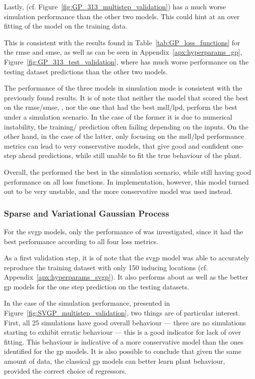 Lastly,  (cf. Figure~\ref{fig:GP_313_multistep_validation}) has a
much worse simulation performance than the other two models. This could hint at
an over fitting of the model on the training data.

\clearpage

This is consistent with the results found in Table~\ref{tab:GP_loss_functions}
for the \acrshort{rmse} and \acrshort{smse}, as well as can be seen in
Appendix~\ref{apx:hyperparams_gp}, Figure~\ref{fig:GP_313_test_validation},
where  has much worse performance on the testing dataset predictions
than the other two models.

The performance of the three models in simulation mode is consistent with the
previously found results. It is of note that neither the model that scored the
best on the \acrshort{rmse}/\acrshort{smse}, , nor the one that
had the best \acrshort{msll}/\acrshort{lpd}, perform the best under a simulation
scenario. In the case of the former it is due to numerical instability, the
training/ prediction often failing depending on the inputs. On the other hand,
in the case of the latter, only focusing on the \acrshort{msll}/\acrshort{lpd}
performance metrics can lead to very conservative models, that give good and
confident one-step ahead predictions, while still unable to fit the true
behaviour of the plant.

Overall, the  performed the best in the simulation scenario,
while still having good performance on all loss functions. In implementation,
however, this model turned out to be very unstable, and the more conservative
 model was used instead.

\subsubsection{Sparse and Variational Gaussian Process}

For the \acrshort{svgp} models, only the performance of  was
investigated, since it had the best performance according to all four loss
metrics. 

As a first validation step, it is of note that the \acrshort{svgp} model was
able to accurately reproduce the training dataset with only 150 inducing
locations (cf.  Appendix~\ref{apx:hyperparams_svgp}). It also performs about as
well as the better \acrshort{gp} models for the one step prediction on the
testing datasets.

In the case of the simulation performance, presented in
Figure~\ref{fig:SVGP_multistep_validation}, two things are of particular
interest. First, all 25 simulations have good overall behaviour --- there are no
simulations starting to exhibit erratic behaviour --- this is a good indicator
for lack of over fitting. This behaviour is indicative of a more conservative
model than the ones identified for the \acrshort{gp} models. It is also possible
to conclude that given the same amount of data, the classical \acrshort{gp}
models can better learn plant behaviour, provided the correct choice of
regressors.

